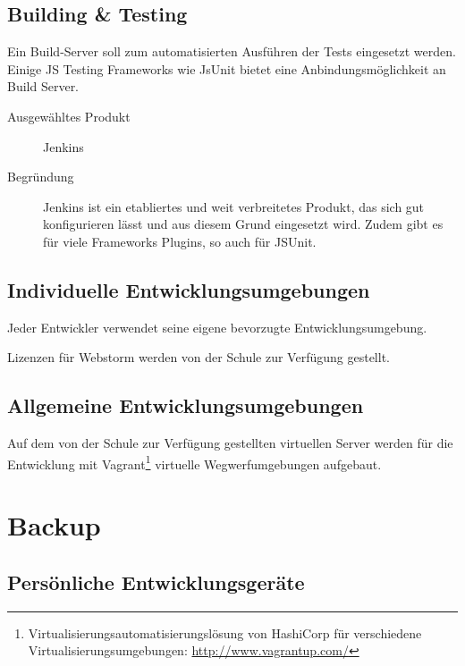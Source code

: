 


		\subsection*{Building \& Testing}
			Ein Build-Server soll zum automatisierten Ausführen der Tests eingesetzt werden.
			Einige JS Testing Frameworks wie JsUnit bietet eine Anbindungsmöglichkeit an Build Server.
			
			\begin{description}
				\item[Ausgewähltes Produkt] Jenkins
				\item[Begründung] Jenkins ist ein etabliertes und weit verbreitetes Produkt, 
					das sich gut konfigurieren lässt und aus diesem Grund eingesetzt wird.
					Zudem gibt es für viele Frameworks Plugins, so auch für JSUnit.
			\end{description}
							
				

		\subsection*{Individuelle Entwicklungsumgebungen}
			Jeder Entwickler verwendet seine eigene bevorzugte Entwicklungsumgebung. 
			
			Lizenzen für Webstorm werden von der Schule zur Verfügung gestellt.


		\subsection*{Allgemeine Entwicklungsumgebungen}
			Auf dem von der Schule zur Verfügung gestellten virtuellen Server werden 
			für die Entwicklung mit Vagrant\footnote{Virtualisierungsautomatisierungslösung von HashiCorp für verschiedene Virtualisierungsumgebungen: \url{http://www.vagrantup.com/}} virtuelle Wegwerfumgebungen aufgebaut.


	\section*{Backup}
		\subsection*{Persönliche Entwicklungsgeräte}
